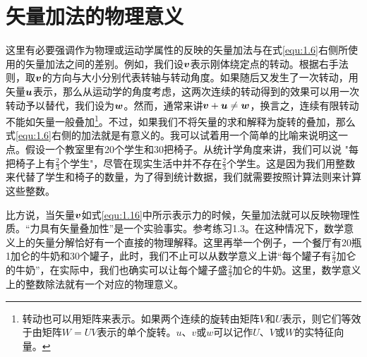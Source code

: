 \section{矢量加法的物理意义}

这里有必要强调作为物理或运动学属性的反映的矢量加法与在式\eqref{equ:1.6}右侧所使用的矢量加法之间的差别。例如，我们设$\boldsymbol{v}$表示刚体绕定点的转动。根据右手法则，取$\boldsymbol{v}$的方向与大小分别代表转轴与转动角度。如果随后又发生了一次转动，用矢量$\boldsymbol{u}$表示，那么从运动学的角度考虑，这两次连续的转动得到的效果可以用一次转动予以替代，我们设为$\boldsymbol{w}$。然而，通常来讲$\boldsymbol{v}+\boldsymbol{u}\ne \boldsymbol{w}$，换言之，连续有限转动不能如矢量一般叠加\footnote{转动也可以用矩阵来表示。如果两个连续的旋转由矩阵$V$和$U$表示，则它们等效于由矩阵$W = UV$表示的单个旋转。$u$、$v$或$w$可以记作$U$、$V$或$W$的实特征向量。}。不过，如果我们不将矢量的求和解释为旋转的叠加，那么式\eqref{equ:1.6}右侧的加法就是有意义的。我可以试着用一个简单的比喻来说明这一点。假设一个教室里有20个学生和30把椅子。从统计学角度来讲，我们可以说 "每把椅子上有$\frac{2}{3}$个学生"，尽管在现实生活中并不存在$\frac{2}{3}$个学生。这是因为我们用整数来代替了学生和椅子的数量，为了得到统计数据，我们就需要按照计算法则来计算这些整数。

比方说，当矢量$\boldsymbol{v}$如式\eqref{equ:1.16}中所示表示力的时候，矢量加法就可以反映物理性质。“力具有矢量叠加性”是一个实验事实。参考练习1.3。在这种情况下，数学意义上的矢量分解恰好有一个直接的物理解释。这里再举一个例子，一个餐厅有20瓶1加仑的牛奶和30个罐子，此时，我们不止可以从数学意义上讲“每个罐子有$\frac{2}{3}$加仑的牛奶”，在实际中，我们也确实可以让每个罐子盛$\frac{2}{3}$加仑的牛奶。这里，数学意义上的整数除法就有一个对应的物理意义。